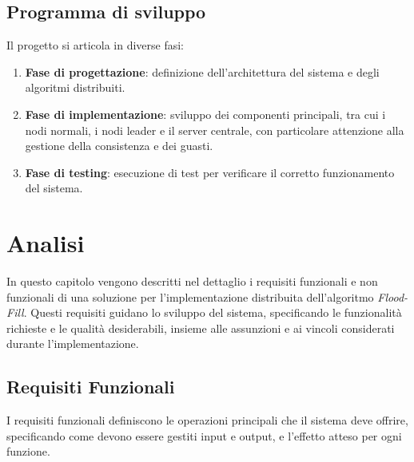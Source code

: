 \documentclass[12pt, a4paper]{report}
\begin{document}
\section{Programma di sviluppo}

Il progetto si articola in diverse fasi:
\begin{enumerate}
    \item \textbf{Fase di progettazione}: definizione dell'architettura del sistema e degli algoritmi distribuiti.
    \item \textbf{Fase di implementazione}: sviluppo dei componenti principali, tra cui i nodi normali, i nodi leader e il server centrale, con particolare attenzione alla gestione della consistenza e dei guasti.
    \item \textbf{Fase di testing}: esecuzione di test per verificare il corretto funzionamento del sistema.
\end{enumerate}

\chapter{Analisi}\label{chapter:analisi}

In questo capitolo vengono descritti nel dettaglio i requisiti funzionali e non funzionali di una soluzione per l'implementazione distribuita dell'algoritmo \emph{Flood-Fill}. Questi requisiti guidano lo sviluppo del sistema, specificando le funzionalit\`a richieste e le qualit\`a desiderabili, insieme alle assunzioni e ai vincoli considerati durante l'implementazione.

\section{Requisiti Funzionali}

I requisiti funzionali definiscono le operazioni principali che il sistema deve offrire, specificando come devono essere gestiti input e output, e l'effetto atteso per ogni funzione.
\end{document}
